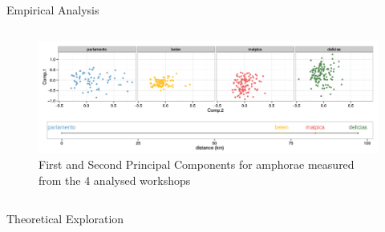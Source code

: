 \documentclass[final]{beamer}
\newlength{\twocolwid}
\begin{document}
\begin{frame}[t]
\begin{columns}[t]
\begin{column}{\twocolwid}
\begin{block}{Empirical Analysis}
\begin{columns}[t,totalwidth=\twocolwid]


\begin{column}{\twocolwid} %
\begin{figure}
\includegraphics[width=0.6\linewidth]{images/fig2.png}
\singlespace
\caption{First and Second Principal Components for amphorae measured from the 4 analysed workshops}
\label{fig:pca}
\end{figure}
\end{column}
\end{columns}
\end{block}
\vspace{-1cm}
\begin{block}{Theoretical Exploration}

\begin{columns}[t,totalwidth=\twocolwid]


\end{columns}
\end{block}
\end{column}
\end{columns}
\end{frame}
\end{document}
